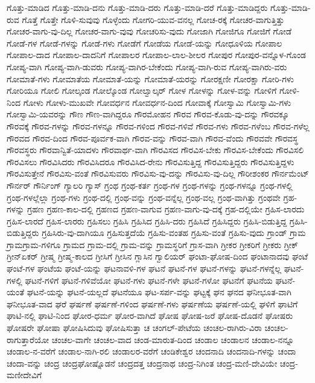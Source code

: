 {ಗೊತ್ತು-ಮಾಡಿದ
ಗೊತ್ತು-ಮಾಡಿ-ದನು
ಗೊತ್ತು-ಮಾಡಿ-ದರು
ಗೊತ್ತು-ಮಾಡಿ-ದರೆ
ಗೊತ್ತು-ಮಾಡಿದ್ದರು
ಗೊತ್ತು-ಮಾಡಿ-ರುವ
ಗೊತ್ತೆ
ಗೊತ್ತೇ
ಗೊಳಿ-ಸುವುವು
ಗೊಳ್ಳೆಂದು
ಗೋಗರಿ-ಯುವ-ವನಲ್ಲ
ಗೋಚ-ರಕ್ಕೆ
ಗೋಚರ-ವಾಗುತ್ತಿತ್ತು
ಗೋಚರ-ವಾಗು-ವು-ದಿಲ್ಲ
ಗೋಚರ-ವಾಗು-ವುವು
ಗೋಚರಿಸು-ವುದು
ಗೋಜಾಗಿ
ಗೋಜಿಗೂ
ಗೋಜಿಗೆ
ಗೋಡೆ
ಗೋಡೆ-ಗಳ
ಗೋಡೆ-ಗಳನ್ನು
ಗೋಡೆ-ಗಳು
ಗೋಡೆಗೆ
ಗೋಡೆಯ
ಗೋಡೆ-ಯನ್ನು
ಗೋಧೂಳಿಯ
ಗೋಪಾಲ
ಗೋಪಾಲ-ದಾದ
ಗೋಪಾಲ-ದಾದನಿಗೆ
ಗೋಪಾಲರ
ಗೋಪಾಲ-ಲಾಲ-ಶೀಲರ
ಗೋಪುರ
ಗೋಪುರ-ವನ್ನೊಳ-ಗೊಂಡ
ಗೋಪ್ಯ-ವಾಗಿ
ಗೋಪ್ಯ-ವಾಗಿ-ಡುವರು
ಗೋಪ್ಯ-ವಾಗಿರ-ಬೇಕೆಂದು
ಗೋಪ್ಯ-ವಾಗಿ-ರುವ
ಗೋಪ್ಯ-ವಾಗಿರು-ವರು
ಗೋಮಾತೆ-ಗಳು
ಗೋಮಾತೆಯ
ಗೋಮಾತೆ-ಯನ್ನು
ಗೋಮಾತೆ-ಯರನ್ನು
ಗೋರಕ್ಷಣೀ
ಗೋರಕ್ಷಾ
ಗೋರಿ-ಗಳು
ಗೋರಿಯೂ
ಗೋಲಿ
ಗೋಲ್ಕಂಡ
ಗೋಲ್ಕೊಂಡ
ಗೋಲ್ವಾಲ್ಕರ್
ಗೋಳ
ಗೋಳನ್ನು
ಗೋಳ-ವನ್ನು
ಗೋಳಿಗೆ
ಗೋಳಿ-ನಿಂದ
ಗೋಳು
ಗೋಳು-ಮುಖವೇ
ಗೋವರ್ಧನ
ಗೋವರ್ಧನ-ದಿಂದ
ಗೋವಾಕ್ಕೆ
ಗೋಸ್ವಾಮಿ
ಗೋಸ್ವಾಮಿ-ಗಳು
ಗೋಸ್ವಾಮಿ-ಯವರನ್ನು
ಗೌಣ
ಗೌಣ-ವಾಗಿದ್ದರೂ
ಗೌರಮೋಹನ
ಗೌರವ
ಗೌರವ-ಕೊಡು-ವು-ದನ್ನು
ಗೌರವಕ್ಕೂ
ಗೌರವಕ್ಕೆ
ಗೌರವ-ಗಳನ್ನು
ಗೌರವ-ಗಳನ್ನೂ
ಗೌರವ-ಗಳಿಂದ
ಗೌರವ-ಗಳಿವೆ
ಗೌರವ-ಗಳು
ಗೌರವ-ಗಳೆಂಬ
ಗೌರವ-ಗಳೆಲ್ಲ
ಗೌರವದ
ಗೌರವ-ದಿಂದ
ಗೌರವ-ಪೂರ್ವಕ-ವಾಗಿ
ಗೌರವ-ವನ್ನು
ಗೌರವ-ವಾಗಿ
ಗೌರವ-ವೆಂದು
ಗೌರವವೇ
ಗೌರವಸ್ಥ
ಗೌರವಸ್ಥರು
ಗೌರವಾನ್ವಿತೆ-ಯಾದಳು
ಗೌರವಾರ್ಥ-ವಾಗಿ
ಗೌರವಿಸದ
ಗೌರವಿಸ-ಬೇಕು
ಗೌರವಿಸ-ಬೇಕೆಂದು
ಗೌರವಿಸಲಿ
ಗೌರವಿಸಲು
ಗೌರವಿಸಿದರು
ಗೌರವಿಸಿದರೂ
ಗೌರವಿಸಿದ-ರೇನು
ಗೌರವಿಸುತ್ತಿದ್ದ
ಗೌರವಿಸುತ್ತಿದ್ದರು
ಗೌರವಿಸುತ್ತಿದ್ದಳು
ಗೌರವಿಸುತ್ತೇನೆ
ಗೌರವಿಸು-ವಂತೆ
ಗೌರವಿಸುವರು
ಗೌರವಿಸು-ವು-ದನ್ನು
ಗೌರವಿಸು-ವು-ದಿಲ್ಲ
ಗೌರೀಶಂಕರ
ಗೌರ್ನಮೆಂಟ್
ಗೌರ್ನರ್
ಗೌರ್ನಿಂಗ್
ಗ್ಯಾಲರಿ
ಗ್ಯಾಸ್
ಗ್ರಂಥ
ಗ್ರಂಥ-ಕರ್ತ
ಗ್ರಂಥ-ಗಳ
ಗ್ರಂಥ-ಗಳನ್ನು
ಗ್ರಂಥ-ಗಳನ್ನೂ
ಗ್ರಂಥ-ಗಳಲ್ಲಿ
ಗ್ರಂಥ-ಗಳಲ್ಲೆಲ್ಲಾ
ಗ್ರಂಥ-ಗಳು
ಗ್ರಂಥ-ದಲ್ಲಿ
ಗ್ರಂಥ-ವನ್ನು
ಗ್ರಂಥ-ವನ್ನೆಲ್ಲ
ಗ್ರಂಥ-ವಲ್ಲ
ಗ್ರಂಥ-ವಾಗಿತ್ತು
ಗ್ರಂಥವೇ
ಗ್ರಹ-ಗಳನ್ನು
ಗ್ರಹಣ
ಗ್ರಹಣ-ಕಾಲ-ದಲ್ಲಿ
ಗ್ರಹಣದ
ಗ್ರಹಣ-ವಾಗುವ
ಗ್ರಹಣ-ವಾಗು-ವು-ದಕ್ಕೆ
ಗ್ರಹ-ದಲ್ಲಿಯೇ
ಗ್ರಹಿಸ-ಲಾರದು
ಗ್ರಹಿಸ-ಲಾರದೆ
ಗ್ರಹಿಸ-ಲಾರರು
ಗ್ರಹಿಸಲು
ಗ್ರಹಿಸಿ
ಗ್ರಹಿಸಿದ
ಗ್ರಹಿಸಿ-ದರು
ಗ್ರಹಿಸಿದೆ
ಗ್ರಹಿಸಿದ್ದರು
ಗ್ರಹಿಸಿ-ಬಿಡುತ್ತಿದ್ದ
ಗ್ರಹಿಸಿ-ಬಿಡುತ್ತಿದ್ದರು
ಗ್ರಹಿಸಿರು-ವು-ದಾಗಿಯೂ
ಗ್ರಹಿಸುತ್ತದೆಯೆ
ಗ್ರಹಿಸು-ವಂತಹ
ಗ್ರಹಿಸು-ವಂತೆ
ಗ್ರಹಿಸು-ವುದು
ಗ್ರಾಂಡ್
ಗ್ರಾಮ
ಗ್ರಾಮಗ್ರಾಮ-ಗಳಿಗೂ
ಗ್ರಾಮದ
ಗ್ರಾಮ-ದಲ್ಲಿ
ಗ್ರಾಮ-ವನ್ನು
ಗ್ರಾಮಸ್ಥರಿಗೆ
ಗ್ರಾಸ-ವಾಗಿ
ಗ್ರೀಕರ
ಗ್ರೀಕರಿಗೆ
ಗ್ರೀಕರು
ಗ್ರೀಕ್
ಗ್ರೀನ್ಏಕರ್
ಗ್ರೀಷ್ಮ
ಗ್ರೀಷ್ಮ-ಕಾಲದ
ಗ್ರೀಸಿಗೆ
ಗ್ರೀಸಿನ
ಗ್ಲಾಸಿನ
ಗ್ವಾಲಿಯರ್
ಘಂಟಾ-ಘೋಷ-ದಿಂದ
ಘಂಟಾನಾದವು
ಘಂಟೆ
ಘಂಟೆ-ಗಳ
ಘಂಟೆಯ
ಘಂಟೆ-ಯನ್ನು
ಘಟನಾವಳಿ-ಗಳ
ಘಟನೆ
ಘಟನೆ-ಗಳ
ಘಟನೆ-ಗಳನ್ನು
ಘಟನೆ-ಗಳನ್ನೆಲ್ಲ
ಘಟನೆ-ಗಳಲ್ಲಿ
ಘಟನೆ-ಗಳಿಗೆ
ಘಟನೆ-ಗಳಿವೆಯೋ
ಘಟನೆ-ಗಳು
ಘಟನೆ-ಗಳೇ
ಘಟನೆ-ಗಳೋ
ಘಟನೆಗೆ
ಘಟನೆಯ
ಘಟನೆ-ಯಂತೆ
ಘಟನೆ-ಯನ್ನು
ಘಟನೆ-ಯಲ್ಲದೆ
ಘಟನೆಯೂ
ಘಟ-ಸರ್ಪ-ವನ್ನು
ಘಟ್ಟಕ್ಕೆ
ಘನ
ಘನದ
ಘನೀಭೂತ-ವಾಗಿ
ಘನೀಭೂತ-ವಾದ
ಘರೆ
ಘರ್ಷಣೆ
ಘರ್ಷಣೆ-ಗಳಿಂದ
ಘರ್ಷಣೆ-ಗಳು
ಘರ್ಷಣೆಯ
ಘರ್ಷಣೆ-ಯಲ್ಲಿ
ಘಳಿಗೆ
ಘಾಟಿಗೆ
ಘಾಟಿ-ನಲ್ಲಿ
ಘಾಟಿ-ನಿಂದ
ಘೋರ-ಧರ್ಮ
ಘೋರ-ವಾಗಿದೆ
ಘೋಷ
ಘೋಷ-ಜರೆ
ಘೋಷ-ದೊಡನೆ
ಘೋಷರು
ಘೋಷರೇ
ಘೋಷಾ
ಘೋಷಿಸಿದುವು
ಘೋಷಿಸುತ್ತಾ
ಚ
ಚಂಗಲ್-ಪೇಟೆಯ
ಚಂಚಲ-ರಾಗಿರು-ವಿರಾ
ಚಂಚಲ-ರಾಗುತ್ತಾರೆಯೋ
ಚಂಚಲ-ವಾಗೇ
ಚಂಚಲ-ವಾದ
ಚಂಡ-ಮಾರುತ-ದಿಂದ
ಚಂಡಾಲ
ಚಂಡಾಲನ
ಚಂಡಾಲ-ನನ್ನೂ
ಚಂಡಾಲ-ನ-ವರೆಗೆ
ಚಂಡಾಲ-ನಾಗಿ-ರಲಿ
ಚಂಡಾಲರ-ವರೆಗೆ
ಚಂಡಿಕೇಶ್ವರ
ಚಂದನಾದಿ
ಚಂದನಾದಿ-ಗಳನ್ನು
ಚಂದಾ
ಚಂದಾ-ವನ್ನು
ಚಂದ್ರ
ಚಂದ್ರಘೋಷ್ನೊಡನೆ
ಚಂದ್ರದತ್ತ
ಚಂದ್ರನಾಥ
ಚಂದ್ರ-ನಿಗಿಂತ
ಚಂದ್ರ-ಮಣಿ-ದೇವಿಯೇ
ಚಂದ್ರ-ಮಣೀದೇವಿಗೆ
}
